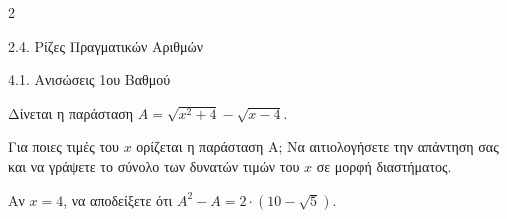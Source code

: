 \begin{ylh}{2}
    \item 2.4. Ρίζες Πραγματικών Αριθμών
    \item 4.1. Ανισώσεις 1ου Βαθμού
\end{ylh}
Δίνεται η παράσταση $A = \sqrt{x^2 + 4} - \sqrt{x - 4}$.

\begin{alist}
\item Για ποιες τιμές του $x$ ορίζεται η παράσταση Α; Να αιτιολογήσετε την απάντηση σας και να γράψετε το σύνολο των δυνατών τιμών του $x$ σε μορφή διαστήματος.
\item Αν $x = 4$, να αποδείξετε ότι $A^2 - A = 2 \cdot (10 - \sqrt{5})$.
\end{alist}

